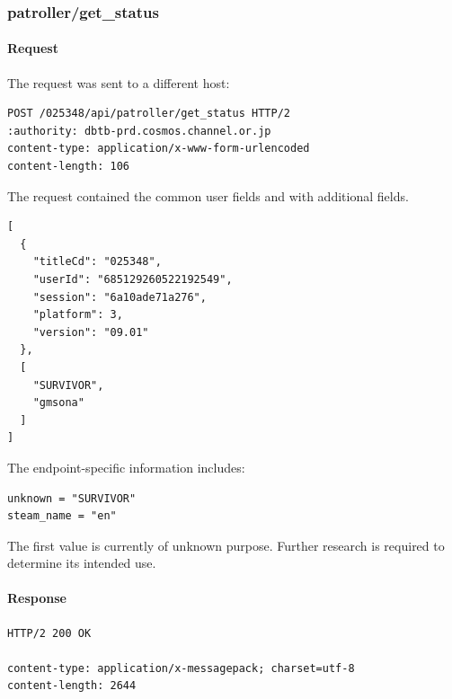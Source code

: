

\subsubsection{patroller/get\_status}
\label{subsec:api_patroller_get_status}

\paragraph{Request}

The request was sent to a different host:

\begin{lstlisting}
POST /025348/api/patroller/get_status HTTP/2
:authority: dbtb-prd.cosmos.channel.or.jp
content-type: application/x-www-form-urlencoded
content-length: 106
\end{lstlisting}

The request contained the common user fields and with additional fields.

\begin{lstlisting}
[
  {
    "titleCd": "025348",
    "userId": "685129260522192549",
    "session": "6a10ade71a276",
    "platform": 3,
    "version": "09.01"
  },
  [
    "SURVIVOR",
    "gmsona"
  ]
]
\end{lstlisting}

The endpoint-specific information includes:

\begin{lstlisting}
unknown = "SURVIVOR"
steam_name = "en"
\end{lstlisting}

\begin{tcolorbox}[colback=yellow!10,colframe=orange!80!black,title=Warning]
The first value is currently of unknown purpose.
Further research is required to determine its intended use.
\end{tcolorbox}

\newpage

\paragraph{Response}

\begin{lstlisting}
HTTP/2 200 OK

content-type: application/x-messagepack; charset=utf-8
content-length: 2644
\end{lstlisting}


